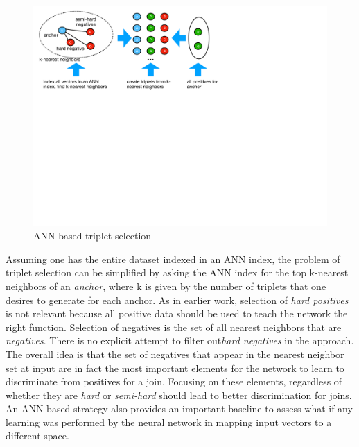 \begin{figure}
\includegraphics[width=1.0\linewidth]{ANN_selection}
\caption{ANN based triplet selection}
\label{ANN_selection}
\end{figure}

Assuming one has the entire dataset indexed in an ANN index, the problem of triplet selection can be simplified by asking the ANN index for the top k-nearest neighbors of an \textit{anchor}, where k is given by the number of triplets that one desires to generate for each anchor.  As in earlier work, selection of \textit{hard positives} is not relevant because all positive data should be used to teach the network the right function.  Selection of negatives is the set of all nearest neighbors that are \textit{negatives}.  There is no explicit attempt to filter out\textit{hard negatives} in the approach.  The overall idea is that the set of negatives that appear in the nearest neighbor set at input are in fact the most important elements for the network to learn to discriminate from positives for a join.  Focusing on these elements, regardless of whether they are \textit{hard} or \textit{semi-hard} should lead to better discrimination for joins.  An ANN-based strategy also provides an important baseline to assess what if any learning was performed by the neural network in mapping input vectors to a different space.
